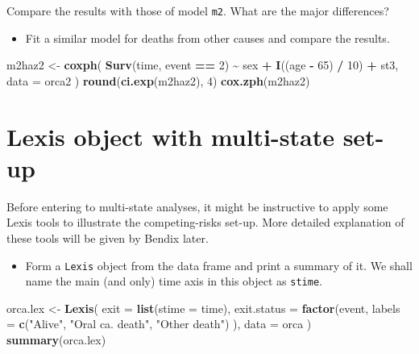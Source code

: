 \documentclass[
]{book}
\newenvironment{Shaded}{\begin{snugshade}}{\end{snugshade}}
\newcommand{\AttributeTok}[1]{\textcolor[rgb]{0.13,0.29,0.53}{#1}}
\newcommand{\DecValTok}[1]{\textcolor[rgb]{0.00,0.00,0.81}{#1}}
\newcommand{\FunctionTok}[1]{\textcolor[rgb]{0.13,0.29,0.53}{\textbf{#1}}}
\newcommand{\NormalTok}[1]{#1}
\newcommand{\OtherTok}[1]{\textcolor[rgb]{0.56,0.35,0.01}{#1}}
\newcommand{\SpecialCharTok}[1]{\textcolor[rgb]{0.81,0.36,0.00}{\textbf{#1}}}
\newcommand{\StringTok}[1]{\textcolor[rgb]{0.31,0.60,0.02}{#1}}
\providecommand{\tightlist}{%
  \setlength{\itemsep}{0pt}\setlength{\parskip}{0pt}}
\begin{document}
Compare the results with those of model \texttt{m2}. What are the major
differences?

\begin{itemize}
\tightlist
\item
  Fit a similar model for deaths from other causes and compare the
  results.
\end{itemize}

\begin{Shaded}
\begin{Highlighting}[]
\NormalTok{m2haz2 }\OtherTok{\textless{}{-}} 
  \FunctionTok{coxph}\NormalTok{(}
    \FunctionTok{Surv}\NormalTok{(time, event }\SpecialCharTok{==} \DecValTok{2}\NormalTok{) }\SpecialCharTok{\textasciitilde{}}\NormalTok{ sex }\SpecialCharTok{+} \FunctionTok{I}\NormalTok{((age }\SpecialCharTok{{-}} \DecValTok{65}\NormalTok{) }\SpecialCharTok{/} \DecValTok{10}\NormalTok{) }\SpecialCharTok{+}\NormalTok{ st3, }
    \AttributeTok{data =}\NormalTok{ orca2}
\NormalTok{  )}
\FunctionTok{round}\NormalTok{(}\FunctionTok{ci.exp}\NormalTok{(m2haz2), }\DecValTok{4}\NormalTok{)}
\FunctionTok{cox.zph}\NormalTok{(m2haz2)}
\end{Highlighting}
\end{Shaded}

\section{Lexis object with multi-state set-up}\label{lexis-object-with-multi-state-set-up}

Before entering to multi-state analyses, it might be instructive to
apply some Lexis tools to illustrate the competing-risks set-up. More
detailed explanation of these tools will be given by Bendix later.

\begin{itemize}
\tightlist
\item
  Form a \texttt{Lexis} object from the data frame and print a summary of it.
  We shall name the main (and only) time axis in this object as \texttt{stime}.
\end{itemize}

\begin{Shaded}
\begin{Highlighting}[]
\NormalTok{orca.lex }\OtherTok{\textless{}{-}} \FunctionTok{Lexis}\NormalTok{(}
  \AttributeTok{exit =} \FunctionTok{list}\NormalTok{(}\AttributeTok{stime =}\NormalTok{ time),}
  \AttributeTok{exit.status =} \FunctionTok{factor}\NormalTok{(event,}
    \AttributeTok{labels =} \FunctionTok{c}\NormalTok{(}\StringTok{"Alive"}\NormalTok{, }\StringTok{"Oral ca. death"}\NormalTok{, }\StringTok{"Other death"}\NormalTok{)}
\NormalTok{  ),}
  \AttributeTok{data =}\NormalTok{ orca}
\NormalTok{)}
\FunctionTok{summary}\NormalTok{(orca.lex)}
\end{Highlighting}
\end{Shaded}
\end{document}
